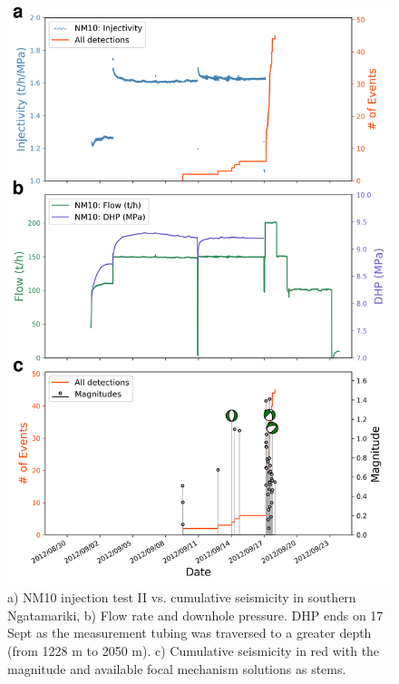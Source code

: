 \begin{figure}[h!]
\begin{center}
\includegraphics[width=0.84\columnwidth]{Chapter_3_Nga/figures/Multiplet_150_vs_flow_cum_NM10_stim/Full_final_cat_flow_mags_FMs_depth_NM10_Stimulation_12-5_GrowClust_labels_no_diff_ABC_original.png}
\caption{{a) NM10 injection test II vs. cumulative seismicity in southern
Ngatamariki, b) Flow rate and downhole pressure. DHP ends on 17 Sept as
the measurement tubing was traversed to a greater depth (from 1228 m to
2050 m). c) Cumulative seismicity in red with the magnitude and
available focal mechanism solutions as stems.
{\label{640752}}%
}}
\end{center}
\end{figure}

